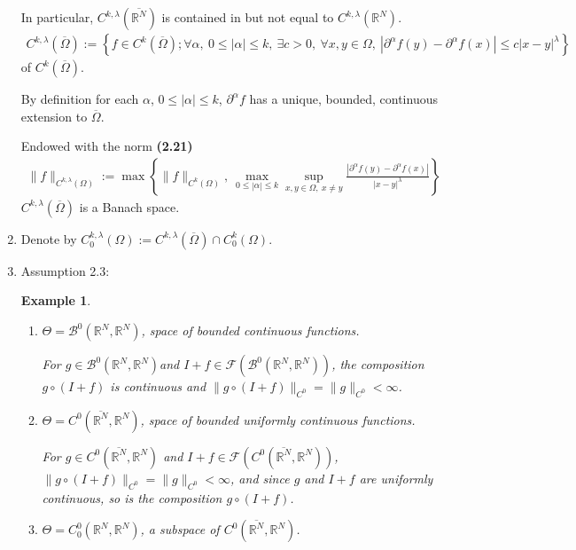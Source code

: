 \documentclass{book}
\numberwithin{equation}{section}
\newtheorem{example}{Example}[section]
\begin{document}
\begin{enumerate}
{        In particular, $C^{k,\lambda}(\overline{\mathbb{R}^N})$ is contained in but not equal to $C^{k,\lambda}(\mathbb{R}^N)$.}
    \begin{align*}
        C^{k,\lambda}(\overline{\Omega}) := \left\{f\in C^k(\overline{\Omega});\forall\alpha,\ 0\le|\alpha|\le k,\ \exists c > 0,\ \forall x,y\in\Omega,\ \left|\partial^\alpha f(y) - \partial^\alpha f(x)\right|\le c\left|x - y\right|^\lambda\right\}
    \end{align*}
    of $C^k(\overline{\Omega})$.
    
    By definition for each $\alpha$, $0\le|\alpha|\le k$, $\partial^\alpha f$ has a unique, bounded, continuous extension to $\overline{\Omega}$.
    
    Endowed with the norm \textbf{(2.21)}
    \begin{align*}
        \|f\|_{C^{k,\lambda}(\Omega)} := \max\left\{\|f\|_{C^k(\Omega)},\ \max_{0\le\left|\alpha\right|\le k}\sup_{x,y\in\Omega,\ x\ne y} \frac{\left|\partial^\alpha f(y) - \partial^\alpha f(x)\right|}{\left|x - y\right|^\lambda}\right\}
    \end{align*}
    $C^{k,\lambda}(\overline{\Omega})$ is a Banach space.
    \item Denote by $C_0^{k,\lambda}(\Omega) := C^{k,\lambda}(\overline{\Omega})\cap C_0^k(\Omega)$.
    \item Assumption 2.3:
    
    \begin{example}
        \begin{enumerate}
            \item $\Theta = \mathcal{B}^0(\mathbb{R}^N,\mathbb{R}^N)$, space of bounded continuous functions.
            
            For $g\in\mathcal{B}^0(\mathbb{R}^N,\mathbb{R}^N)$and $I + f\in\mathcal{F}(\mathcal{B}^0(\mathbb{R}^N,\mathbb{R}^N))$, the composition $g\circ(I + f)$ is continuous and $\|g\circ(I + f)\|_{C^0} = \|g\|_{C^0} < \infty$.
            \item $\Theta = C^0(\overline{\mathbb{R}^N},\mathbb{R}^N)$, space of bounded uniformly continuous functions.
            
            For $g\in C^0(\overline{\mathbb{R}^N},\mathbb{R}^N)$ and $I + f\in\mathcal{F}(C^0(\overline{\mathbb{R}^N},\mathbb{R}^N))$, $\|g\circ(I + f)\|_{C^0} = \|g\|_{C^0} < \infty$, and since $g$ and $I + f$ are uniformly continuous, so is the composition $g\circ(I + f)$.
            \item $\Theta = C_0^0(\mathbb{R}^N,\mathbb{R}^N)$, a subspace of $C^0(\overline{\mathbb{R}^N},\mathbb{R}^N)$.
            

\end{enumerate}
\end{example}
\end{enumerate}
\end{document}
